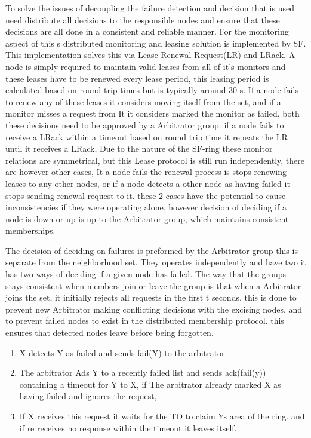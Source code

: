 \documentclass[a4paper,10pt,titlepage]{report}
\begin{document}
To solve the issues of decoupling the failure detection and decision that is used need distribute all decisions to the responsible nodes and ensure that these decisions are all done in a consistent and reliable manner. For the monitoring aspect of this s distributed monitoring and leasing solution is implemented by SF. This implementation solves this via Lease Renewal Request(LR) and LRack. A node is simply required to maintain valid leases from all of it's monitors and these leases have to be renewed every lease period, this leasing period is calculated based on round trip times but is typically around 30 s. If a node fails to renew any of these leases it considers moving itself from the set, and if a monitor misses a request from It it considers marked the monitor as failed. both these decisions need to be approved by a Arbitrator group. if a node fails to receive a LRack within a timeout based on round trip time it repeats the LR until it receives a LRack, Due to the nature of the SF-ring these monitor relations are symmetrical, but this Lease protocol is still run independently, there are however other cases, It a node fails the renewal process is stops renewing leases to any other nodes, or if a node detects a other node as having failed it stops sending renewal request to it. these 2 cases have the potential to cause inconsistencies if they were operating alone, however decision of deciding if a node is down or up is up to the Arbitrator group, which maintains consistent memberships. \\
\vspace{5mm}

The decision of deciding on failures is preformed by the Arbitrator group this is separate from the neighborhood set. They operates independently and have two it has two ways of deciding if a given node has failed. The way that the groups stays consistent when members join or leave the group is that when a Arbitrator joins the set, it initially rejects all requests in the first t seconds, this is done to prevent new Arbitrator making conflicting decisions with the excising nodes, and to prevent failed nodes to exist in the distributed membership protocol. this ensures that detected nodes leave before being forgotten.\\
\vspace{5mm}

\begin{enumerate}
    \item X detects Y as failed and sends fail(Y) to the arbitrator
    \item The arbitrator Ads Y to a recently failed list and sends ack(fail(y)) containing a timeout for Y to X, if The arbitrator already marked X as having failed and ignores the request, 
    \item If X receives this request it waits for the TO to claim Ys area of the ring. and if re receives no response within the timeout it leaves itself.
\end{enumerate}
\end{document}
